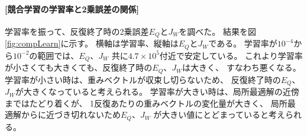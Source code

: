 \documentclass[a4j]{jarticle}
\begin{document}
\paragraph{[競合学習の学習率と2乗誤差の関係]}

学習率を振って、反復終了時の2乗誤差$E_Q$と$J_W$を調べた。
結果を図\ref{fig:compLearn}に示す。
横軸は学習率、縦軸は$E_Q$と$J_W$である。
学習率が$10^{-4}$から$10^{-2}$の範囲では、$E_Q$、$J_W$
共に$4.7\times 10^5$付近で安定している。
これより学習率が小さくても大きくても、反復終了時の$E_Q$、$J_W$は大きく、
すなわち悪くなる。
学習率が小さい時は、重みベクトルが収束し切らないため、
反復終了時の$E_Q$、$J_W$が大きくなっていると考えられる。
学習率が大きい時は、局所最適解の近傍まではたどり着くが、
1反復あたりの重みベクトルの変化量が大きく、
局所最適解からに近づき切れないため$E_Q$、$J_W$
が大きい値にとどまっていると考えられる。
\end{document}
